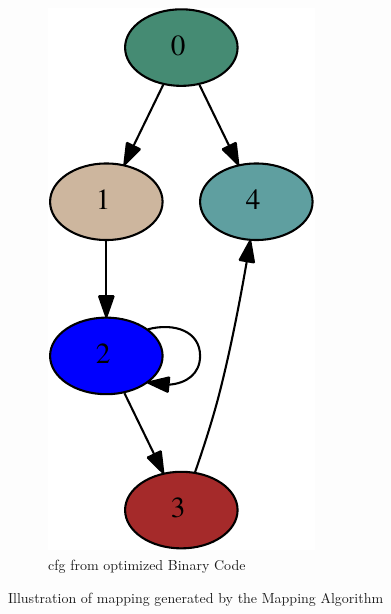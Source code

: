 \begin{figure}[h!]
\begin{subfigure}[t]{.33\textwidth}
\captionsetup{margin=10pt}
\includegraphics[width=\textwidth]{figures/obj_my_ctop_IR_adpcm_coder-crop.pdf}
\caption{\gls{cfg} from optimized Binary Code}
\label{fig:cfgAdpcmBin}
\end{subfigure}%
\caption{Illustration of mapping generated by the Mapping Algorithm}
\label{fig:adpcmMapping}
\end{figure}

